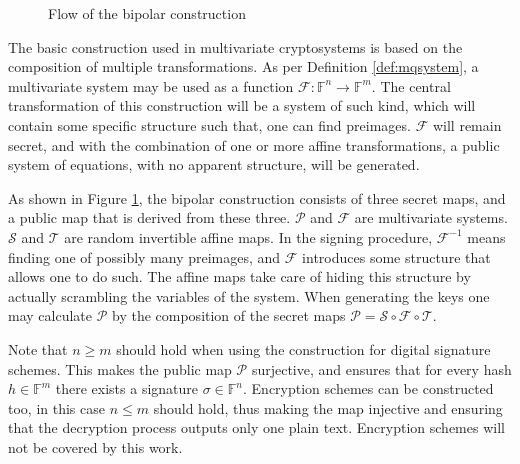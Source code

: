 \documentclass{ufsctex/ufsctex}
\begin{document}
\begin{figure}
\centering
{}
\caption{Flow of the bipolar construction}\label{fig:bipolar}
\end{figure}

The basic construction used in multivariate cryptosystems is based on the
composition of multiple transformations. As per Definition \ref{def:mqsystem},
a multivariate system may be used as a function
$\mathcal{F}:\mathbb{F}^n\to\mathbb{F}^m$. The central transformation of this
construction will be a system of such kind, which will contain some specific
structure such that, one can find preimages. $\mathcal{F}$ will remain secret,
and with the combination of one or more affine transformations, a public system
of equations, with no apparent structure, will be generated.

As shown in Figure \ref{fig:bipolar}, the bipolar construction consists of
three secret maps, and a public map that is derived from these three.
$\mathcal{P}$ and $\mathcal{F}$ are multivariate systems. $\mathcal{S}$ and
$\mathcal{T}$ are random invertible affine maps. In the signing procedure,
$\mathcal{F}^{-1}$ means finding one of possibly many preimages, and
$\mathcal{F}$ introduces some structure that allows one to do such. The affine
maps take care of hiding this structure by actually scrambling the variables of
the system. When generating the keys one may calculate $\mathcal{P}$ by the
composition of the secret maps $\mathcal{P} = \mathcal{S} \circ \mathcal{F}
\circ \mathcal{T}$.

Note that $n \geq m$ should hold when using the construction for digital
signature schemes. This makes the public map $\mathcal{P}$ surjective, and
ensures that for every hash $h \in \mathbb{F}^m$ there exists a signature
$\sigma \in \mathbb{F}^n$. Encryption schemes can be constructed too, in this
case $n \leq m$ should hold, thus making the map injective and ensuring that
the decryption process outputs only one plain text. Encryption schemes will not
be covered by this work.
\end{document}
